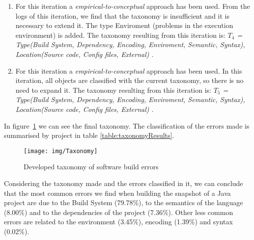 \begin{enumerate}
	\vspace{2mm}
	\item For this iteration a \textit{empirical-to-conceptual} approach has been used. From the logs of this iteration, we find that the taxonomy is insufficient and it is necessary to extend it. The type Enviroment (problems in the execution environment) is added. The taxonomy resulting from this iteration is: \textit{$T_{4}$ = {Type(Build System, Dependency, Encoding, Enviroment, Semantic, Syntax), Location(Source code, Config files, External) }}.
	
	\vspace{2mm}
	\item For this iteration a \textit{empirical-to-conceptual} approach has been used. In this iteration, all objects are classified with the current taxonomy, so there is no need to expand it. The taxonomy resulting from this iteration is: \textit{$T_{5}$ = {Type(Build System, Dependency, Encoding, Enviroment, Semantic, Syntax), Location(Source code, Config files, External) }}.
\end{enumerate}          

In figure~\ref{fig:taxonomyTree} we can see the final taxonomy. The classification of the errors made is summarised by project in table \ref{table:taxonomyResults}.

\begin{figure}[h!]
	\begin{center}
		\texttt{[image: img/Taxonomy]}
		\caption{Developed taxonomy of software build errors}
		\label{fig:taxonomyTree}
	\end{center}
\end{figure}



\vspace{0.3cm}
\begin{tcolorbox}[fonttitle=\bfseries,title=Answer to RQ2: What are the most common problems that cause
	snapshot build fail?,label=rq2,colframe=blue!50!black]
	Considering the taxonomy made and the errors classified in it, we can conclude that the most common errors we find when building the snapshot of a Java project are due to the Build System (79.78\%), to the semantics of the language (8.00\%) and to the dependencies of the project (7.36\%). Other less common errors are related to the environment (3.45\%), encoding (1.39\%) and syntax (0.02\%).
\end{tcolorbox}

